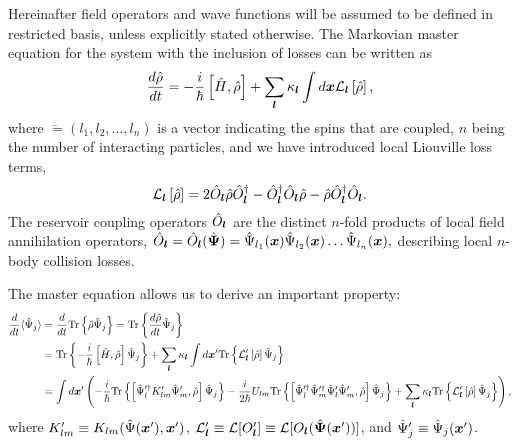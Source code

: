 Hereinafter field operators and wave functions will be assumed to be defined in restricted basis, unless explicitly stated otherwise.
The Markovian master equation for the system with the inclusion of losses can be written as~\cite{Jack2002}
\begin{equation}
	\frac{d\hat{\rho}}{dt} =
		- \frac{i}{\hbar} \left[ \hat{H}, \hat{\rho} \right]
		+ \sum\limits_{\boldsymbol{l}} \kappa_{\boldsymbol{l}} \int d\boldsymbol{x}
			\mathcal{L}_{\boldsymbol{l}} \left[ \hat{\rho} \right],
\end{equation}
where $\lvec = (l_1, l_2, \ldots, l_n)$ is a vector indicating the spins that are coupled,
$n$ being the number of interacting particles,
and we have introduced local Liouville loss terms,
\begin{equation}
	\mathcal{L}_{\boldsymbol{l}} \left[ \hat{\rho} \right] =
		2\hat{O}_{\boldsymbol{l}} \hat{\rho} \hat{O}_{\boldsymbol{l}}^\dagger
		- \hat{O}_{\boldsymbol{l}}^\dagger \hat{O}_{\boldsymbol{l}} \hat{\rho}
		- \hat{\rho} \hat{O}_{\boldsymbol{l}}^\dagger \hat{O}_{\boldsymbol{l}}.
\end{equation}
The reservoir coupling operators $\hat{O}_{\boldsymbol{l}}$ are the distinct $n$-fold products of local field annihilation operators,
$\hat{O}_{\boldsymbol{l}} = \hat{O}_{\boldsymbol{l}} (\hat{\boldsymbol{\Psi}}) =
	\hat{\Psi}_{l_{1}} (\boldsymbol{x})
	\hat{\Psi}_{l_{2}} (\boldsymbol{x}) \ldots
	\hat{\Psi}_{l_{n}} (\boldsymbol{x}),$
describing local $n$-body collision losses.

The master equation allows us to derive an important property:
\begin{equation*}
\begin{split}
	\frac{d}{dt} \langle \hat{\Psi}_j \rangle
	& = \frac{d}{dt} \mathrm{Tr} \left\{  \hat{\rho} \hat{\Psi}_j  \right\}
	= \mathrm{Tr} \left\{  \frac{d\hat{\rho}}{dt} \hat{\Psi}_j  \right\} \\
	& = \mathrm{Tr} \left\{  -\frac{i}{\hbar} \left[ \hat{H}, \hat{\rho} \right] \hat{\Psi}_j  \right\}
	+ \sum\limits_{\boldsymbol{l}} \kappa_{\boldsymbol{l}} \int d\boldsymbol{x}^\prime
		\mathrm{Tr} \left\{ 
			\mathcal{L}_{\boldsymbol{l}}^\prime \left[ \hat{\rho} \right]
			\hat{\Psi}_j
		 \right\} \\
	& = \int d\boldsymbol{x}^\prime \left(
		- \frac{i}{\hbar} \mathrm{Tr} \left\{ 
			\left[
				\hat{\Psi}_l^{\prime\dagger} K_{lm}^\prime \hat{\Psi}_m^\prime,
				\hat{\rho}
			\right] \hat{\Psi}_j
		 \right\}
		- \frac{i}{2\hbar} U_{lm} \mathrm{Tr} \left\{ 
			\left[
				\hat{\Psi}_l^{\prime\dagger} \hat{\Psi}_m^{\prime\dagger}
				\hat{\Psi}_l^\prime \hat{\Psi}_m^\prime,
				\hat{\rho}
			\right] \hat{\Psi}_j
		 \right\}
		+ \sum\limits_{\boldsymbol{l}} \kappa_{\boldsymbol{l}}
			\mathrm{Tr} \left\{ 
				\mathcal{L}_{\boldsymbol{l}}^\prime \left[ \hat{\rho} \right]
				\hat{\Psi}_j
			 \right\}
	\right),
\end{split}
\end{equation*}
where $K_{lm}^\prime \equiv K_{lm}(\hat{\Psi}(\boldsymbol{x}^\prime), \boldsymbol{x}^\prime)$,
$\mathcal{L}_{\boldsymbol{l}}^\prime \equiv \mathcal{L} [ O_{\boldsymbol{l}}^\prime ] \equiv \mathcal{L} [ O_{\boldsymbol{l}} ( \hat{\boldsymbol{\Psi}}(\boldsymbol{x}^\prime) ) ]$,
and $\hat{\Psi}_j^\prime \equiv \hat{\Psi}_j (\boldsymbol{x}^\prime)$.

